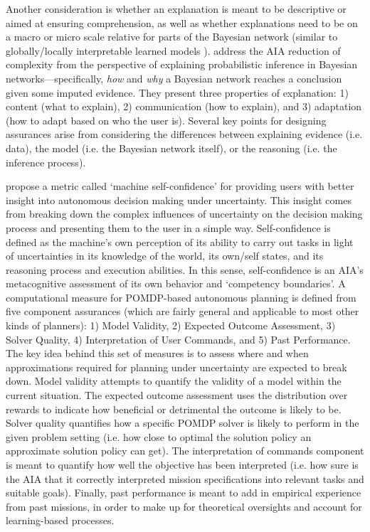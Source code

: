 Another consideration is whether an explanation is meant to be descriptive or aimed at ensuring comprehension, as well as whether explanations need to be on a macro or micro scale relative for parts of the Bayesian network (similar to globally/locally interpretable learned models \cite{Ruping2006-xj}). 
\citet{Lacave2002-cu} address the AIA reduction of complexity from the perspective of explaining probabilistic inference in Bayesian networks---specifically, \emph{how} and \emph{why} a Bayesian network reaches a conclusion given some imputed evidence. 
They present three properties of explanation: 1) content (what to explain), 2) communication (how to explain), and 3) adaptation (how to adapt based on who the user is). Several key points for designing assurances arise from considering the differences between explaining evidence (i.e. data), the model (i.e. the Bayesian network itself), or the reasoning (i.e. the inference process).

\citet{Aitken2016-cv} propose a metric called `machine self-confidence' for providing users with better insight into autonomous decision making under uncertainty. This insight comes from breaking down the complex influences of uncertainty on the decision making process and presenting them to the user in a simple way. Self-confidence is defined as the machine's own perception of its ability to carry out tasks in light of uncertainties in its knowledge of the world, its own/self states, and its reasoning process and execution abilities. In this sense, self-confidence is an AIA's metacognitive assessment of its own behavior and `competency boundaries'. A computational measure for POMDP-based autonomous planning is defined from five component assurances (which are fairly general and applicable to most other kinds of planners): 1) Model Validity, 2) Expected Outcome Assessment, 3) Solver Quality, 4) Interpretation of User Commands, and 5) Past Performance. 
The key idea behind this set of measures is to assess where and when approximations required for planning under uncertainty are expected to break down. Model validity attempts to quantify the validity of a model within the current situation. The expected outcome assessment uses the distribution over rewards to indicate how beneficial or detrimental the outcome is likely to be. Solver quality quantifies how a specific POMDP solver is likely to perform in the given problem setting (i.e. how close to optimal the solution policy an approximate solution policy can get). The interpretation of commands component is meant to quantify how well the objective has been interpreted (i.e. how sure is the AIA that it correctly interpreted mission specifications into relevant tasks and suitable goals). Finally, past performance is meant to add in empirical experience from past missions, in order to make up for theoretical oversights and account for learning-based processes.

